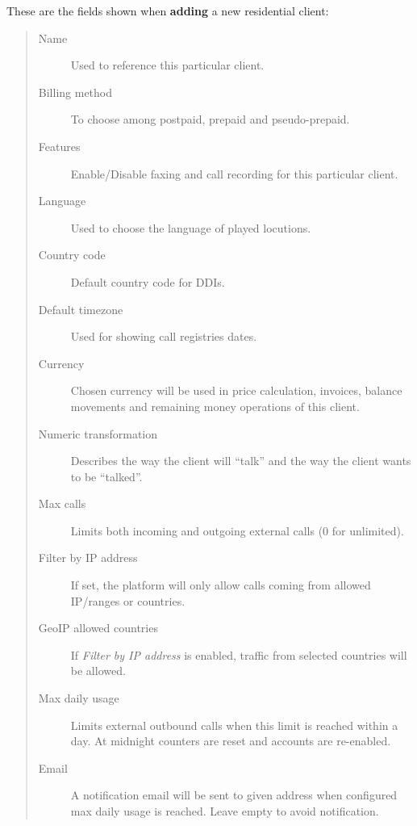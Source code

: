 \documentclass[letterpaper,10pt,spanish]{sphinxmanual}
\begin{document}
These are the fields shown when \textbf{adding} a new residential client:
\begin{quote}
\begin{description}
\item[{Name}] \leavevmode
Used to reference this particular client.

\item[{Billing method}] \leavevmode
To choose among postpaid, prepaid and pseudo-prepaid.

\item[{Features}] \leavevmode
Enable/Disable faxing and call recording for this particular client.

\item[{Language}] \leavevmode
Used to choose the language of played locutions.

\item[{Country code}] \leavevmode
Default country code for DDIs.

\item[{Default timezone}] \leavevmode
Used for showing call registries dates.

\item[{Currency}] \leavevmode
Chosen currency will be used in price calculation, invoices, balance movements and
remaining money operations of this client.

\item[{Numeric transformation}] \leavevmode
Describes the way the client will ``talk'' and the way the client wants to be ``talked''.

\item[{Max calls}] \leavevmode
Limits both incoming and outgoing external calls (0 for unlimited).

\item[{Filter by IP address}] \leavevmode
If set, the platform will only allow calls coming from allowed IP/ranges or countries.

\item[{GeoIP allowed countries}] \leavevmode
If \emph{Filter by IP address} is enabled, traffic from selected countries will be allowed.

\item[{Max daily usage}] \leavevmode
Limits external outbound calls when this limit is reached within a day. At midnight counters are reset and
accounts are re-enabled.

\item[{Email}] \leavevmode
A notification email will be sent to given address when configured max daily usage is reached. Leave empty to
avoid notification.

\end{description}
\end{quote}
\end{document}
